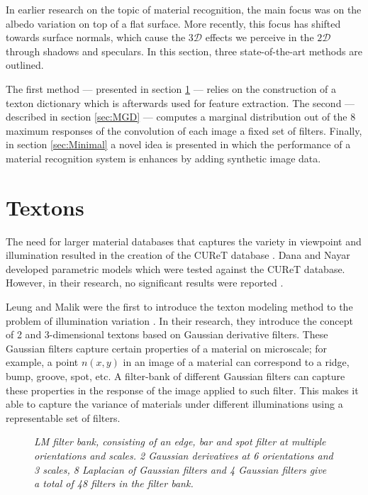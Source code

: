 \hypertarget{RelatedWork}{
}
In earlier research on the topic of material recognition, the main focus was on the albedo variation on top of a flat surface. More recently, this focus has shifted towards surface normals, which cause the $3\mathcal{D}$ effects we perceive in the $2\mathcal{D}$ through shadows and speculars. In this section, three state-of-the-art methods are outlined.

The first method --- presented in section \ref{sec:Textons} --- relies on the construction of a texton dictionary which is afterwards used for feature extraction. The second --- described in section \ref{sec:MGD} --- computes a marginal distribution out of the 8 maximum responses of the convolution of each image a fixed set of filters. Finally, in section \ref{sec:Minimal} a novel idea is presented in which the performance of a material recognition system is enhances by adding synthetic image data.


\section{Textons}\label{sec:Textons}

The need for larger material databases that captures the variety in viewpoint and illumination resulted in the creation of the CUReT database \cite{DanaNayar}. Dana and Nayar developed parametric models  which were tested against the CUReT database. However, in their research, no significant results were reported \cite{VarmaZisserman}.

Leung and Malik were the first to introduce the texton modeling method to the problem of illumination variation \cite{LeungMalik}. In their research, they introduce the concept of 2 and 3-dimensional textons based on Gaussian derivative filters. These Gaussian filters capture certain properties of a material on microscale; for example, a point $n(x,y)$ in an image of a material can correspond to a ridge, bump, groove, spot, etc. A filter-bank of different Gaussian filters can capture these properties in the response of the image applied to such filter. This makes it able to capture the variance of materials under different illuminations using a representable set of filters.

\begin{figure}[b]
	\begin{center}
	\end{center}
	\caption{\textit{LM filter bank, consisting of an edge, bar and spot filter at multiple orientations and scales. 2 Gaussian derivatives at 6 orientations and 3 scales, 8 Laplacian of Gaussian filters and 4 Gaussian filters give a total of 48 filters in the filter bank.}}
	\label{fig:LM}
\end{figure}



